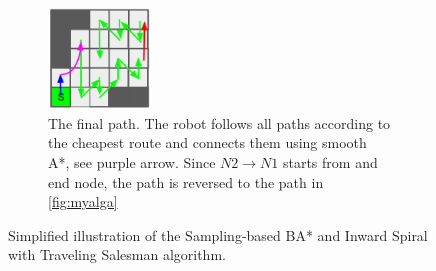 \begin{figure}
\begin{subfigure}{\textwidth}
    \label{fig:myalgc}
    \end{subfigure}
     \begin{subfigure}{\textwidth}
    \centering
    \includegraphics[width=0.3\textwidth]{figures/Sampled_total.png}
    \caption{The final path. The robot follows all paths according to the cheapest route and connects them using smooth A*, see purple arrow. Since $N2\rightarrow N1$ starts from and end node, the path is reversed to the path in \ref{fig:myalga}}
    \label{fig:myalgd}
    \end{subfigure}
    
    \caption{Simplified illustration of the Sampling-based BA* and Inward Spiral with Traveling Salesman algorithm.}
    \label{fig:myalg}
\end{figure}

